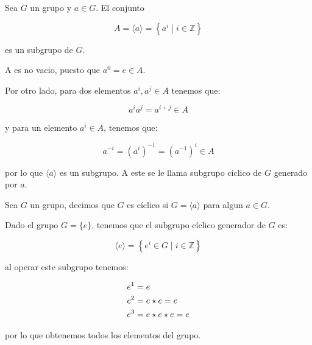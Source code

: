         \begin{definicion}
            Sea $G$ un grupo y $a \in G$. El conjunto

            \begin{equation}
                A = \langle a \rangle = \left\{ a^i \mid i \in \mathbb{Z} \right\}
            \end{equation}

            es un subgrupo de $G$.

            A es no vacio, puesto que $a^0 = e \in A$.

            Por otro lado, para dos elementos $a^i, a^j \in A$ tenemos que:

            \begin{equation*}
                a^i a^j = a^{i+j} \in A
            \end{equation*}

            y para un elemento $a^i \in A$, tenemos que:

            \begin{equation*}
                a^{-i} = \left( a^i \right)^{-1} = \left( a^{-1} \right)^i \in A
            \end{equation*}

            por lo que $\langle a \rangle$ es un subgrupo. A este se le llama subgrupo cíclico de $G$ generado por $a$.
        \end{definicion}

        \begin{definicion}
            Sea $G$ un grupo, decimos que $G$ es cíclico si $G = \langle a \rangle$ para algun $a \in G$.
        \end{definicion}

        \begin{ejemplo}
            Dado el grupo $G = \{e\}$, tenemos que el subgrupo cíclico generador de $G$ es:

            \begin{equation*}
                \langle e \rangle = \left\{ e^i \in G \mid i \in \mathbb{Z} \right\}
            \end{equation*}

            al operar este subgrupo tenemos:

            \begin{align*}
                e^1 &= e \\
                e^2 &= e \star e = e \\
                e^3 &= e \star e \star e = e
            \end{align*}

            por lo que obtenemos todos los elementos del grupo.
        \end{ejemplo}

